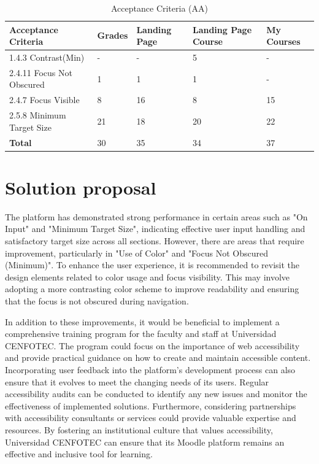 \documentclass{IEEEtran}
\begin{document}
\begin{table}[h]
    \centering
    \caption{Acceptance Criteria (AA)}
    \label{tab:table2}
    \begin{tabularx}{\columnwidth}{|l|X|X|X|X|}
    \hline
    \textbf{Acceptance Criteria} & \textbf{Grades} & \textbf{Landing Page} & \textbf{Landing Page Course} & \textbf{My Courses}  \\ 
    \hline
    1.4.3 Contrast(Min) & - & - & 5 & - 
    \\ \hline
    2.4.11 Focus Not Obscured& 1 & 1 & 1 & - 
    \\ \hline
    2.4.7 Focus Visible & 8 & 16 & 8 & 15 
    \\ \hline
    2.5.8 Minimum Target Size & 21 & 18 & 20 & 22 
    \\ \hline
    \textbf{Total} & 30 & 35 & 34 & 37 
    \\ \hline
    \end{tabularx}
    \end{table}
    



\section{Solution proposal}
The platform has demonstrated strong performance in certain areas such as "On Input" and "Minimum Target Size", indicating effective user input handling and satisfactory target size across all sections. However, there are areas that require improvement, particularly in "Use of Color" and "Focus Not Obscured (Minimum)". To enhance the user experience, it is recommended to revisit the design elements related to color usage and focus visibility. This may involve adopting a more contrasting color scheme to improve readability and ensuring that the focus is not obscured during navigation. 

In addition to these improvements, it would be beneficial to implement a comprehensive training program for the faculty and staff at Universidad CENFOTEC. The program could focus on the importance of web accessibility and provide practical guidance on how to create and maintain accessible content. Incorporating user feedback into the platform's development process can also ensure that it evolves to meet the changing needs of its users. Regular accessibility audits can be conducted to identify any new issues and monitor the effectiveness of implemented solutions. Furthermore, considering partnerships with accessibility consultants or services could provide valuable expertise and resources. By fostering an institutional culture that values accessibility, Universidad CENFOTEC can ensure that its Moodle platform remains an effective and inclusive tool for learning.
\end{document}
